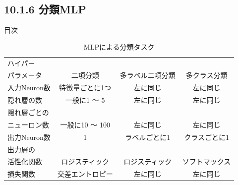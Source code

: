 \documentclass[aspectratio=169, dvipdfmx, 14pt, xcolor={svgnames,dvipsnames}]{beamer}
\def\tightlist{\itemsep1pt\parskip0pt\parsep0pt}
\begin{document}

\hypertarget{ux5206ux985emlp}{%
  \subsection{10.1.6 分類MLP}\label{ux5206ux985emlp}}
\begin{frame}{\quad 目次}
  \tableofcontents[currentsubsection]
\end{frame}


\begin{frame}{}
  \begin{table}[H]
    \centering
    \caption{MLPによる分類タスク}
    \label{order_table}
    \begin{tabular}{l||ccc}
      \hline
      ハイパー                                                        \\パラメータ & 二項分類         & 多ラベル二項分類 & 多クラス分類   \\ \hline
      入力Neuron数 & 特徴量ごとに1つ  & 左に同じ      & 左に同じ      \\ \hline
      隠れ層の数   & 一般に1 ～ 5     & 左に同じ      & 左に同じ      \\ \hline
      隠れ層ごとの                                                    \\ニューロン数 & 一般に10 ～ 100 & 左に同じ         & 左に同じ     \\ \hline
      出力Neuron数 & 1                & ラベルごとに1 & クラスごとに1 \\ \hline
      出力層の                                                        \\活性化関数 & ロジスティック   & ロジスティック   & ソフトマックス \\ \hline
      損失関数     & 交差エントロピー & 左に同じ      & 左に同じ      \\ \hline
    \end{tabular}
  \end{table}




\end{frame}
\end{document}
